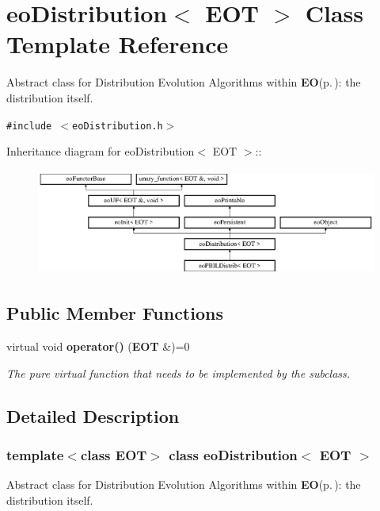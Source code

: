 \section{eo\-Distribution$<$ EOT $>$ Class Template Reference}
\label{classeo_distribution}
Abstract class for Distribution Evolution Algorithms within {\bf EO}{\rm (p.\,\pageref{class_e_o})}: the distribution itself.  


{\tt \#include $<$eo\-Distribution.h$>$}

Inheritance diagram for eo\-Distribution$<$ EOT $>$::\begin{figure}[H]
\begin{center}
\leavevmode
\includegraphics[height=3.48259cm]{classeo_distribution}
\end{center}
\end{figure}
\subsection*{Public Member Functions}
\begin{CompactItemize}
\item 
virtual void {\bf operator()} ({\bf EOT} \&)=0\label{classeo_distribution_a0}

\begin{CompactList}\small\item\em The pure virtual function that needs to be implemented by the subclass. \item\end{CompactList}\end{CompactItemize}


\subsection{Detailed Description}
\subsubsection*{template$<$class EOT$>$ class eo\-Distribution$<$ EOT $>$}

Abstract class for Distribution Evolution Algorithms within {\bf EO}{\rm (p.\,\pageref{class_e_o})}: the distribution itself. 

